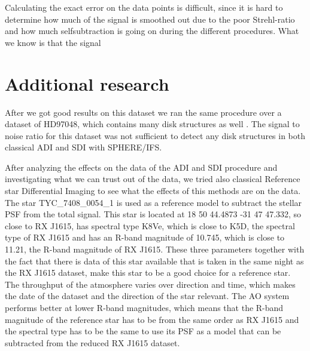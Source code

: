\documentclass[twoside,single]{lion-msc}
\begin{document}
Calculating the exact error on the data points is difficult, since it is hard to determine how much of the signal is smoothed out due to the poor Strehl-ratio and how much selfsubtraction is going on during the different procedures. What we know is that the signal 

\chapter{Additional research}
After we got good results on this dataset we ran the same procedure over a dataset of HD97048, which contains many disk structures as well \citep{Ginski2016}. The signal to noise ratio for this dataset was not sufficient to detect any disk structures in both classical ADI and SDI with SPHERE/IFS.
\bigskip

After analyzing the effects on the data of the ADI and SDI procedure and investigating what we can trust out of the data, we tried also classical Reference star Differential Imaging to see what the effects of this methods are on the data. The star TYC\_7408\_0054\_1 is used as a reference model to subtract the stellar PSF from the total signal. This star is located at 18 50 44.4873 -31 47 47.332, so close to RX J1615, has spectral type K8Ve, which is close to K5D, the spectral type of RX J1615 and has an R-band magnitude of 10.745, which is close to 11.21, the R-band magnitude of RX J1615. These three parameters together with the fact that there is data of this star available that is taken in the same night as the RX J1615 dataset, make this star to be a good choice for a reference star. The throughput of the atmosphere varies over direction and time, which makes the date of the dataset and the direction of the star relevant. 
The AO system performs better at lower R-band magnitudes, which means that the R-band magnitude of the reference star has to be from the same order as RX J1615 and the spectral type has to be the same to use its PSF as a model that can be subtracted from the reduced RX J1615 dataset.
\bigskip
\end{document}
